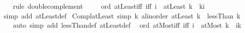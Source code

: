 \begin{isabellebody}
\ \ \isamarkupfalse%
\ {\isacharparenleft}{\kern0pt}rule\ double{\isacharunderscore}{\kern0pt}complement{\isacharparenright}{\kern0pt}\isanewline
\ \ \isamarkupfalse%
%
\endisatagproof
{\isafoldproof}%
%
\isadelimproof
\isanewline
%
\endisadelimproof
\isanewline
{}\isamarkupfalse%
\ {\isacharparenleft}{\kern0pt}\ ord{\isacharparenright}{\kern0pt}\ atLeast{\isacharunderscore}{\kern0pt}iff\ {\isacharbrackleft}{\kern0pt}iff{\isacharbrackright}{\kern0pt}{\isacharcolon}{\kern0pt}\ {\isachardoublequoteopen}{\isacharparenleft}{\kern0pt}i\ {\isasymin}\ atLeast\ k{\isacharparenright}{\kern0pt}\ {\isacharequal}{\kern0pt}\ {\isacharparenleft}{\kern0pt}k{\isacharless}{\kern0pt}{\isacharequal}{\kern0pt}i{\isacharparenright}{\kern0pt}{\isachardoublequoteclose}\isanewline
%
\isadelimproof
%
\endisadelimproof
%
\isatagproof
{}\isamarkupfalse%
\ {\isacharparenleft}{\kern0pt}simp\ add{\isacharcolon}{\kern0pt}\ atLeast{\isacharunderscore}{\kern0pt}def{\isacharparenright}{\kern0pt}%
\endisatagproof
{\isafoldproof}%
%
\isadelimproof
\isanewline
%
\endisadelimproof
\isanewline
{}\isamarkupfalse%
\ Compl{\isacharunderscore}{\kern0pt}atLeast\ {\isacharbrackleft}{\kern0pt}simp{\isacharbrackright}{\kern0pt}{\isacharcolon}{\kern0pt}\ {\isachardoublequoteopen}{\isacharbang}{\kern0pt}{\isacharbang}{\kern0pt}k{\isacharcolon}{\kern0pt}{\isacharcolon}{\kern0pt}\ {\isacharprime}{\kern0pt}a{\isacharcolon}{\kern0pt}{\isacharcolon}{\kern0pt}linorder{\isachardot}{\kern0pt}\ {\isacharminus}{\kern0pt}atLeast\ k\ {\isacharequal}{\kern0pt}\ lessThan\ k{\isachardoublequoteclose}\isanewline
%
\isadelimproof
\ \ %
\endisadelimproof
%
\isatagproof
{}\isamarkupfalse%
\ {\isacharparenleft}{\kern0pt}auto\ simp\ add{\isacharcolon}{\kern0pt}\ lessThan{\isacharunderscore}{\kern0pt}def\ atLeast{\isacharunderscore}{\kern0pt}def{\isacharparenright}{\kern0pt}%
\endisatagproof
{\isafoldproof}%
%
\isadelimproof
\isanewline
%
\endisadelimproof
\isanewline
{}\isamarkupfalse%
\ {\isacharparenleft}{\kern0pt}\ ord{\isacharparenright}{\kern0pt}\ atMost{\isacharunderscore}{\kern0pt}iff\ {\isacharbrackleft}{\kern0pt}iff{\isacharbrackright}{\kern0pt}{\isacharcolon}{\kern0pt}\ {\isachardoublequoteopen}{\isacharparenleft}{\kern0pt}i\ {\isasymin}\ atMost\ k{\isacharparenright}{\kern0pt}\ {\isacharequal}{\kern0pt}\ {\isacharparenleft}{\kern0pt}i{\isacharless}{\kern0pt}{\isacharequal}{\kern0pt}k{\isacharparenright}{\kern0pt}{\isachardoublequoteclose}\isanewline
%
\isadelimproof
%
\endisadelimproof

\end{isabellebody}
